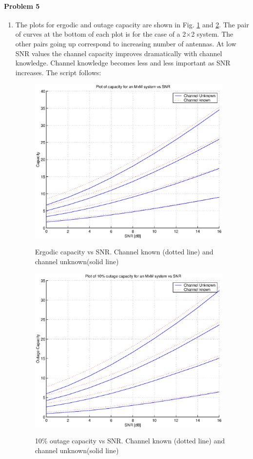 \documentclass[12pt]{article}
\begin{document}
\paragraph{Problem 5} \begin{enumerate}
\item The plots for ergodic and outage capacity are shown in Fig.
\ref{fig:p1_erg} and \ref{fig:p1_out}.  The pair of curves at the
bottom of each plot is for the case of a 2$\times$2 system.  The
other pairs going up correspond to increasing number of antennas.
At low SNR values the channel capacity improves dramatically with
channel knowledge.  Channel knowledge becomes less and less
important as SNR increases.  The script follows:
\begin{footnotesize}


\end{footnotesize}
\begin{figure}
  \centering
  \includegraphics[width=4in]{p1c_vs_snr.eps}\\
  \caption{\footnotesize Ergodic capacity vs SNR.  Channel known (dotted line) and channel unknown(solid line)}
  \label{fig:p1_erg}
\end{figure}
\begin{figure}
  \centering
  \includegraphics[width=4in]{p1c_outage_vs_snr.eps}\\
  \caption{\footnotesize 10\% outage capacity vs SNR.  Channel known (dotted line) and channel unknown(solid line)}
  \label{fig:p1_out}
\end{figure}


\end{enumerate}
\end{document}
